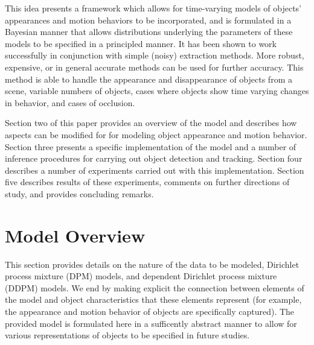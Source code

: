 \documentclass{article}
\begin{document}



This idea presents a framework which allows for time-varying models of objects' appearances and motion behaviors to be incorporated, and is formulated in a Bayesian manner that allows distributions underlying the parameters of these models to be specified in a principled manner. It has been shown to work successfully in conjunction with simple (noisy) extraction methods. More robust, expensive, or in general accurate methods can be used for further accuracy. This method is able to handle the appearance and disappearance of objects from a scene, variable numbers of objects, cases where objects show time varying changes in behavior, and cases of occlusion.

Section two of this paper provides an overview of the model and describes how aspects can be modified for for modeling object appearance and motion behavior. Section three presents a specific implementation of the model and a number of inference procedures for carrying out object detection and tracking. Section four describes a number of experiments carried out with this implementation. Section five describes results of these experiments, comments on further directions of study, and provides concluding remarks. 













\section{Model Overview}
%
This section provides details on the nature of the data to be modeled, Dirichlet process mixture (DPM) models, and dependent Dirichlet process mixture (DDPM) models. We end by making explicit the connection between elements of the model and object characteristics that these elements represent (for example, the appearance and motion behavior of objects are specifically captured). The provided model is formulated here in a sufficently abstract manner to allow for various representations of objects to be specified in future studies.
\end{document}

